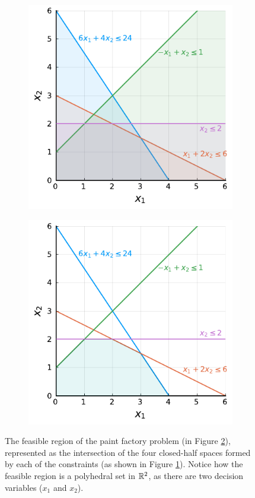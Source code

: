 \begin{figure}[h]
	\begin{subfigure}{0.45\textwidth}
		\includegraphics[scale=0.97]{part_1/chapter_1/figures/figure1-3a.pdf}	
		\caption{} \label{p1c1:fig:fig3a}
	\end{subfigure}
	\begin{subfigure}{0.45\textwidth}
		\includegraphics[scale=0.97]{part_1/chapter_1/figures/figure1-3b.pdf}
		\caption{} \label{p1c1:fig:fig3b}		
	\end{subfigure}
	\caption{The feasible region of the paint factory problem (in Figure \ref{p1c1:fig:fig3b}), represented as the intersection of the four closed-half spaces formed by each of the constraints (as shown in Figure \ref{p1c1:fig:fig3a}). Notice how the feasible region is a polyhedral set in $\mathbb{R}^2$, as there are two decision variables ($x_1$ and $x_2$).} \label{p1c1:fig:feasible_region_plot}	
\end{figure}

